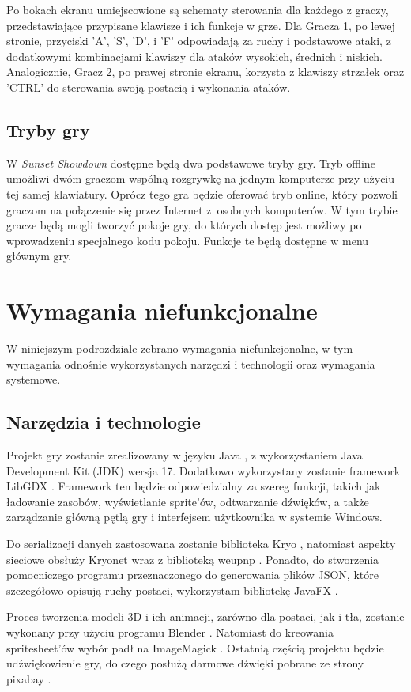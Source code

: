 Po bokach ekranu umiejscowione są schematy sterowania dla każdego z graczy, przedstawiające przypisane klawisze i ich funkcje w grze. Dla Gracza 1, po lewej stronie, przyciski 'A', 'S', 'D', i 'F' odpowiadają za ruchy i podstawowe ataki, z dodatkowymi kombinacjami klawiszy dla ataków wysokich, średnich i niskich. Analogicznie, Gracz 2, po prawej stronie ekranu, korzysta z klawiszy strzałek oraz 'CTRL' do sterowania swoją postacią i wykonania ataków.

\subsection{Tryby gry}
W \emph{Sunset Showdown} dostępne będą dwa podstawowe tryby gry. Tryb offline umożliwi dwóm graczom wspólną rozgrywkę na jednym komputerze przy użyciu tej samej klawiatury. Oprócz tego gra będzie oferować tryb online, który pozwoli graczom na połączenie się przez Internet z~osobnych komputerów. W tym trybie gracze będą mogli tworzyć pokoje gry, do których dostęp jest możliwy po wprowadzeniu specjalnego kodu pokoju. Funkcje te będą dostępne w menu głównym gry.

\section{Wymagania niefunkcjonalne}
W niniejszym podrozdziale zebrano wymagania niefunkcjonalne, w tym wymagania odnośnie wykorzystanych narzędzi i technologii oraz wymagania systemowe.

\subsection{Narzędzia i technologie}
Projekt gry zostanie zrealizowany w języku Java \cite{Java}, z wykorzystaniem Java Development Kit (JDK) wersja 17.
Dodatkowo wykorzystany zostanie framework LibGDX \cite{LibGDX}. Framework ten będzie odpowiedzialny za szereg funkcji, takich jak ładowanie zasobów, wyświetlanie sprite'ów, odtwarzanie dźwięków, a także zarządzanie główną pętlą gry i interfejsem użytkownika w systemie Windows. 

Do serializacji danych zastosowana zostanie biblioteka Kryo \cite{Kryo}, natomiast aspekty sieciowe obsłuży Kryonet \cite{Kryonet} wraz z biblioteką weupnp \cite{weupnp}. Ponadto, do stworzenia pomocniczego programu przeznaczonego do generowania plików JSON, które szczegółowo opisują ruchy postaci, wykorzystam bibliotekę JavaFX \cite{JavaFX}. 

Proces tworzenia modeli 3D i ich animacji, zarówno dla postaci, jak i tła, zostanie wykonany przy użyciu programu Blender \cite{Blender}. Natomiast do kreowania spritesheet'ów wybór padł na ImageMagick \cite{ImageMagick}. Ostatnią częścią projektu będzie udźwiękowienie gry, do czego posłużą darmowe dźwięki pobrane ze strony pixabay \cite{Pixabay}. 


